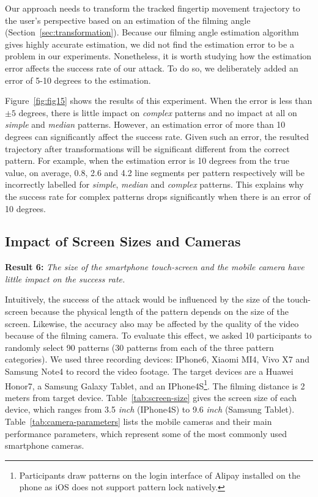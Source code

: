    Our approach needs to transform the tracked fingertip movement trajectory to the
   user's perspective based on an estimation of the filming angle
   (Section~\ref{sec:transformation}).
   Because our filming angle estimation
    algorithm gives highly accurate estimation, we did not find the estimation error to be a problem in our experiments.
   Nonetheless, it is worth studying how the estimation error affects the success rate of our attack. To do so, we deliberately added an error of 5-10 degrees to the estimation.

    Figure~\ref{fig:fig15} shows the results of this experiment. When the error is less than $\pm 5$ degrees, there is little impact
    on \emph{complex} patterns and no impact at all on \emph{simple} and
    \emph{median} patterns. However, an estimation error of more than 10 degrees can significantly affect the success rate.
    Given such an error, the resulted trajectory after transformations will
    be significant different from the correct pattern.
    For example, when the estimation error is 10 degrees from the
    true value,  on average, 0.8, 2.6 and 4.2 line segments per pattern respectively will
    be incorrectly labelled for \emph{simple}, \emph{median} and
    \emph{complex} patterns. This explains why the success rate for complex patterns drops significantly when there is
    an error of 10 degrees.

    \subsection{Impact of Screen Sizes and Cameras}
    \noindent \textbf{Result 6:} \emph{The size of the smartphone touch-screen and the mobile camera have little impact on the success rate.}

    Intuitively, the success of the attack would be influenced by the size of
    the touch-screen because the physical length of the pattern depends on
    the size of the screen. Likewise, the accuracy also may be affected by
    the quality of the video because of the filming camera. To evaluate this
    effect, we asked 10 participants to randomly select 90 patterns (30
    patterns from each of the three pattern categories). We used three
    recording devices: IPhone6, Xiaomi MI4, Vivo X7 and Samsung Note4 to
    record the video footage. The target devices are a Huawei Honor7, a
    Samsung Galaxy Tablet, and an IPhone4S\footnote{Participants draw
    patterns on the login interface of Alipay installed on the phone as iOS
    does not support pattern lock natively.}. The filming distance is 2
    meters from target device. Table~\ref{tab:screen-size} gives the screen
    size of each device, which ranges from 3.5 \emph{inch} (IPhone4S) to
    9.6 \emph{inch} (Samsung Tablet). Table~\ref{tab:camera-parameters} lists
    the mobile cameras and their main performance parameters, which
    represent some of the most commonly used smartphone cameras.

